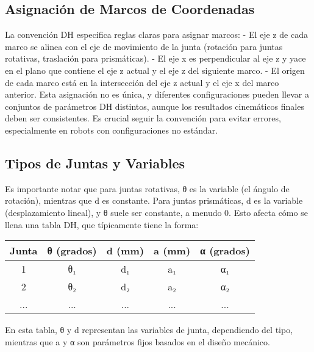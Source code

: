 \documentclass{article}%
\begin{document}
%
\subsection{Asignación de Marcos de Coordenadas}%
\label{subsec:AsignacindeMarcosdeCoordenadas}%
La convención DH especifica reglas claras para asignar marcos:\newline%
%
{-} El eje z de cada marco se alinea con el eje de movimiento de la junta (rotación para juntas rotativas, traslación para prismáticas).\newline%
%
{-} El eje x es perpendicular al eje z y yace en el plano que contiene el eje z actual y el eje z del siguiente marco.\newline%
%
{-} El origen de cada marco está en la intersección del eje z actual y el eje x del marco anterior.\newline%
%
Esta asignación no es única, y diferentes configuraciones pueden llevar a conjuntos de parámetros DH distintos, aunque los resultados cinemáticos finales deben ser consistentes. Es crucial seguir la convención para evitar errores, especialmente en robots con configuraciones no estándar.\newline%

%
\subsection{Tipos de Juntas y Variables}%
\label{subsec:TiposdeJuntasyVariables}%
Es importante notar que para juntas rotativas, θ es la variable (el ángulo de rotación), mientras que d es constante. Para juntas prismáticas, d es la variable (desplazamiento lineal), y θ suele ser constante, a menudo 0. Esto afecta cómo se llena una tabla DH, que típicamente tiene la forma:\newline%
%
\begin{tabular}{|c|c|c|c|c|}%
\hline%
\textbf{Junta}&\textbf{θ (grados)}&\textbf{d (mm)}&\textbf{a (mm)}&\textbf{α (grados)}\\%
\hline%
1&θ₁&d₁&a₁&α₁\\%
2&θ₂&d₂&a₂&α₂\\%
...&...&...&...&...\\%
\hline%
\end{tabular}%
En esta tabla, θ y d representan las variables de junta, dependiendo del tipo, mientras que a y α son parámetros fijos basados en el diseño mecánico.\newline%

%
\end{document}
